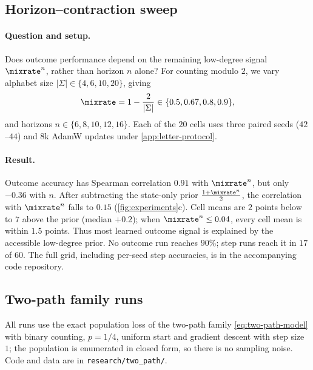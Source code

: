 \subsection{Horizon--contraction sweep}
\label{app:exp-lambda}
\paragraph{Question and setup.} Does outcome performance depend on the remaining low-degree signal $\mixrate^n$, rather than horizon $n$ alone?
For counting modulo $2$, we vary alphabet size $|\Sigma|\in\{4,6,10,20\}$, giving
\[
 \mixrate=1-\frac{2}{|\Sigma|}\in\{0.5,0.67,0.8,0.9\},
\]
and horizons $n\in\{6,8,10,12,16\}$. Each of the $20$ cells uses three paired seeds ($42$--$44$) and $8$k AdamW updates
under \cref{app:letter-protocol}.

\paragraph{Result.} Outcome accuracy has Spearman correlation $0.91$ with $\mixrate^n$, but only $-0.36$ with $n$.
After subtracting the state-only prior $\frac{1+\mixrate^n}{2}$, the correlation with $\mixrate^n$ falls to $0.15$ (\cref{fig:experiments}c).
Cell means are $2$ points below to $7$ above the prior (median $+0.2$); when $\mixrate^n\le0.04$, every cell mean is within $1.5$ points.
Thus most learned outcome signal is explained by the accessible low-degree prior. No outcome run reaches $90\%$;
step runs reach it in $17$ of $60$. The full grid, including per-seed step accuracies, is in the accompanying code repository.

\subsection{Two-path family runs}
\label{app:two-path-experiments}
All runs use the exact population loss of the two-path family \cref{eq:two-path-model} with binary counting, $p=1/4$,
uniform start and gradient descent with step size $1$; the population is enumerated in closed form, so there is no sampling
noise. Code and data are in \nolinkurl{research/two_path/}.

